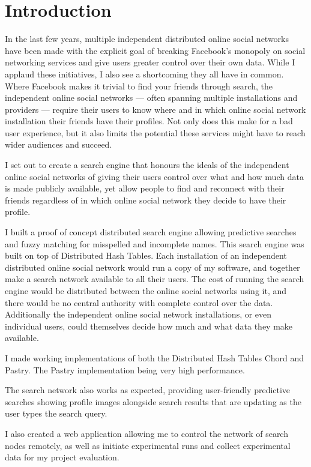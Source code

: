 


\chapter{Introduction}
In the last few years, multiple independent distributed online social networks have been made with the explicit goal of breaking Facebook's monopoly on social networking services and give users greater control over their own data.
While I applaud these initiatives, I also see a shortcoming they all have in common. Where Facebook makes it trivial to find your friends through search, the independent online social networks --- often spanning multiple installations and providers --- require their users to know where and in which online social network installation their friends have their profiles. Not only does this make for a bad user experience, but it also limits the potential these services might have to reach wider audiences and succeed.

I set out to create a search engine that honours the ideals of the independent online social networks of giving their users control over what and how much data is made publicly available, yet allow people to find and reconnect with their friends regardless of in which online social network they decide to have their profile.

I built a proof of concept distributed search engine allowing predictive searches and fuzzy matching for misspelled and incomplete names. This search engine was built on top of Distributed Hash Tables. Each installation of an independent distributed online social network would run a copy of my software, and together make a search network available to all their users. The cost of running the search engine would be distributed between the online social networks using it, and there would be no central authority with complete control over the data. Additionally the independent online social network installations, or even individual users, could themselves decide how much and what data they make available.

I made working implementations of both the Distributed Hash Tables Chord and Pastry. The Pastry implementation being very high performance.

The search network also works as expected, providing user-friendly predictive searches showing profile images alongside search results that are updating as the user types the search query.

I also created a web application allowing me to control the network of search nodes remotely, as well as initiate experimental runs and collect experimental data for my project evaluation.
